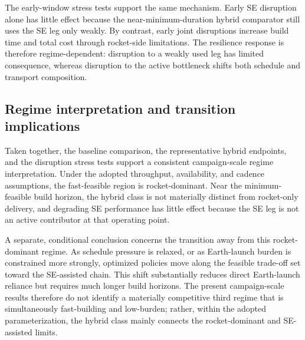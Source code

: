 \documentclass[12pt]{article}
\begin{document}
\begin{table}[htbp]
	\centering
	\caption{Early-window disruption stress test for the near-minimum-duration hybrid comparator.
		SE throughput [Mt] denotes cumulative Earth$\to$Apex lift over $[0,T_b+1]$.}
	\label{tab:early_disrupt}
	
	\small
	\setlength{\tabcolsep}{3pt}
	\renewcommand{\arraystretch}{1.1}
	
\end{table}

The early-window stress tests support the same mechanism. Early SE disruption alone has little effect because the near-minimum-duration hybrid comparator still uses the SE leg only weakly. By contrast, early joint disruptions increase build time and total cost through rocket-side limitations. The resilience response is therefore regime-dependent: disruption to a weakly used leg has limited consequence, whereas disruption to the active bottleneck shifts both schedule and transport composition.

\subsection{Regime interpretation and transition implications}
\label{subsec:regime_behavior}

Taken together, the baseline comparison, the representative hybrid endpoints, and the disruption stress tests support a consistent campaign-scale regime interpretation. Under the adopted throughput, availability, and cadence assumptions, the fast-feasible region is rocket-dominant. Near the minimum-feasible build horizon, the hybrid class is not materially distinct from rocket-only delivery, and degrading SE performance has little effect because the SE leg is not an active contributor at that operating point.

A separate, conditional conclusion concerns the transition away from this rocket-dominant regime. As schedule pressure is relaxed, or as Earth-launch burden is constrained more strongly, optimized policies move along the feasible trade-off set toward the SE-assisted chain. This shift substantially reduces direct Earth-launch reliance but requires much longer build horizons. The present campaign-scale results therefore do not identify a materially competitive third regime that is simultaneously fast-building and low-burden; rather, within the adopted parameterization, the hybrid class mainly connects the rocket-dominant and SE-assisted limits.
\end{document}
